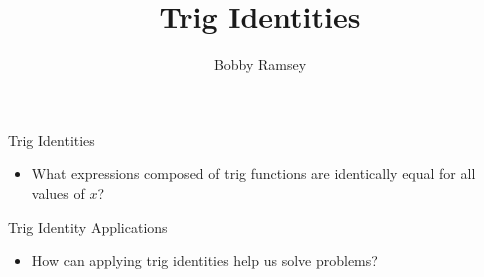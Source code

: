 \documentclass{ximera}
\author{Bobby Ramsey}
\title{Trig Identities}
\begin{document}
\begin{abstract}
\end{abstract}
\maketitle


\begin{objectives}
	\item Trig Identities
		\begin{itemize}
			\item What expressions composed of trig functions are identically equal for all values of $x$?
		\end{itemize}
\item Trig Identity Applications
		\begin{itemize}
			\item How can applying trig identities help us solve problems?
		\end{itemize}
\end{objectives}
\end{document}
